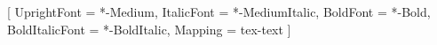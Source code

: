 
\usepackage{fourier-otf}
\usepackage[condensed]{roboto}         %
\renewcommand{\seriesdefault}{m}      %
\newfontfamily{}[
	UprightFont = *-Medium,
	ItalicFont = *-MediumItalic,
	BoldFont = *-Bold,
	BoldItalicFont = *-BoldItalic,
	Mapping = tex-text
]

\newcommand{\coverTitleFace}{\rmfamily\bfseries\fontsize{27pt}{32pt}\selectfont}
\newcommand{\coverAuthorFace}{\rmfamily\scshape\fontsize{21pt}{25pt}\selectfont}
\newcommand{\coverKindFace}{\rmfamily\itshape\fontsize{15pt}{19pt}\selectfont}
\newcommand{\coverInfoFace}{\rmfamily\fontsize{11pt}{15pt}\selectfont}
\newcommand{\coverDateFace}{\rmfamily\fontsize{13pt}{16pt}\selectfont}
\newcommand{\coverImprintFace}{\rmfamily\itshape\fontsize{13pt}{16pt}\selectfont}
\newcommand{\coverHalfTitleFace}{%
	\rmfamily\scshape\fontsize{14pt}{18pt}\selectfont
	\addfontfeature{LetterSpace=4.5}}

\newcommand{\coverRule}{\rule{\textwidth}{0.6pt}}

\newlength{\coverLogoHeight}

